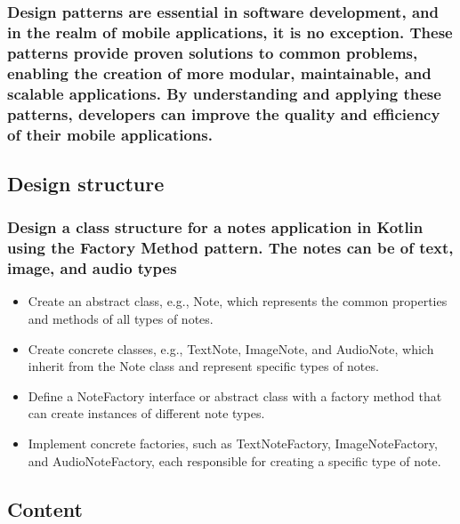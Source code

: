 \chapter{}
\subsection*{Design patterns are essential in software development, and in the realm of mobile applications, it is no exception. These patterns provide proven solutions to common problems, enabling the creation of more modular, maintainable, and scalable applications. By understanding and applying these patterns, developers can improve the quality and efficiency of their mobile applications.}
\section{Design structure}
\subsection*{Design a class structure for a notes application in Kotlin using the Factory Method pattern. The notes can be of text, image, and audio types}

\begin{itemize}
	\item Create an abstract class, e.g., Note, which represents the common properties and methods of all types of notes.
	\item Create concrete classes, e.g., TextNote, ImageNote, and AudioNote, which inherit from the Note class and represent specific types of notes.
	\item Define a NoteFactory interface or abstract class with a factory method that can create instances of different note types.
	\item Implement concrete factories, such as TextNoteFactory, ImageNoteFactory, and AudioNoteFactory, each responsible for creating a specific type of note.
\end{itemize}


\section{Content}
